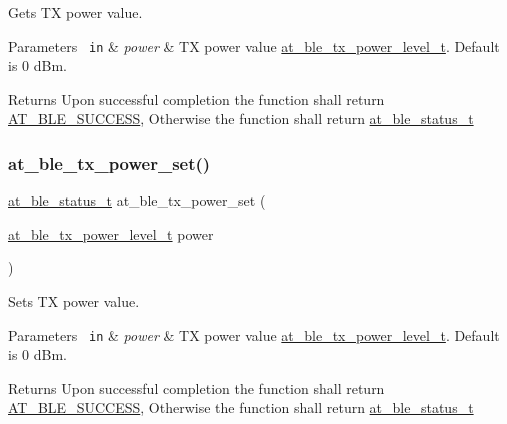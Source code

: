 Gets TX power value. 


\begin{DoxyParams}[1]{Parameters}
\mbox{\texttt{ in}}  & {\em power} & TX power value \mbox{\hyperlink{at__ble__api_8h_ad386e054a6ad3e11fc538a0796061404}{at\+\_\+ble\+\_\+tx\+\_\+power\+\_\+level\+\_\+t}}. Default is 0 d\+Bm.\\
\hline
\end{DoxyParams}
\begin{DoxyReturn}{Returns}
Upon successful completion the function shall return \mbox{\hyperlink{group__error__codes__group_gga3b1db9b95feb157b3c188ca27fe76988a7e3bfff5387331cd4f2c56cbcbbd7e19}{A\+T\+\_\+\+B\+L\+E\+\_\+\+S\+U\+C\+C\+E\+SS}}, Otherwise the function shall return \mbox{\hyperlink{at__ble__api_8h_ace24eb4e5ca3f325c663b809da5feb92}{at\+\_\+ble\+\_\+status\+\_\+t}} 
\end{DoxyReturn}
\mbox{\label{group__gap__misc__group_ga157b800cc43266a7c8afb90df9443796}} 
\subsubsection{\texorpdfstring{at\_ble\_tx\_power\_set()}{at\_ble\_tx\_power\_set()}}
{\footnotesize\ttfamily \mbox{\hyperlink{group__error__codes__group_ga3b1db9b95feb157b3c188ca27fe76988}{at\+\_\+ble\+\_\+status\+\_\+t}} at\+\_\+ble\+\_\+tx\+\_\+power\+\_\+set (\begin{DoxyParamCaption}\item[{\mbox{\hyperlink{at__ble__api_8h_ad386e054a6ad3e11fc538a0796061404}{at\+\_\+ble\+\_\+tx\+\_\+power\+\_\+level\+\_\+t}}}]{power }\end{DoxyParamCaption})}



Sets TX power value. 


\begin{DoxyParams}[1]{Parameters}
\mbox{\texttt{ in}}  & {\em power} & TX power value \mbox{\hyperlink{at__ble__api_8h_ad386e054a6ad3e11fc538a0796061404}{at\+\_\+ble\+\_\+tx\+\_\+power\+\_\+level\+\_\+t}}. Default is 0 d\+Bm.\\
\hline
\end{DoxyParams}
\begin{DoxyReturn}{Returns}
Upon successful completion the function shall return \mbox{\hyperlink{group__error__codes__group_gga3b1db9b95feb157b3c188ca27fe76988a7e3bfff5387331cd4f2c56cbcbbd7e19}{A\+T\+\_\+\+B\+L\+E\+\_\+\+S\+U\+C\+C\+E\+SS}}, Otherwise the function shall return \mbox{\hyperlink{at__ble__api_8h_ace24eb4e5ca3f325c663b809da5feb92}{at\+\_\+ble\+\_\+status\+\_\+t}} 
\end{DoxyReturn}
\mbox{\label{group__gap__misc__group_gafbcae7ff40f05d01e17b41430ae2987f}} 
